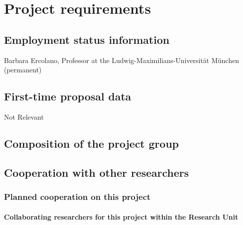 \documentclass[10pt,fleqn,twoside]{article}
\begin{document}
\section{Project requirements}
\renewcommand{\leftmark}{\sc Project requirements}

\subsection{Employment status information}

Barbara Ercolano, Professor at the Ludwig-Maximilians-Universit\"at
M\"unchen  (permanent)



\subsection{First-time proposal data}

Not Relevant

\subsection{Composition of the project group}


\subsection{Cooperation with other researchers}

\subsubsection{Planned cooperation on this project}

\paragraph{Collaborating researchers for this project within the
  Research Unit}
\end{document}
